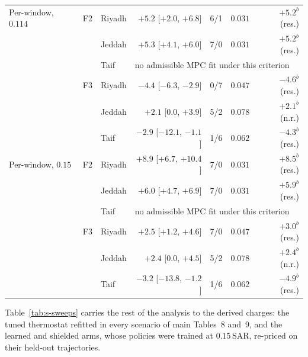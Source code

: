 \documentclass[11pt]{article}
\newcommand{\SAR}{\text{SAR}}
\begin{document}
\begin{table}[!ht]
\begin{tabularx}{\textwidth}{@{}llXrrrr@{}}
Per-window, $0.114$ & F2 & Riyadh & $+5.2$ [$+2.0$, $+6.8$] & 6/1 & $0.031$ & $+5.2^{b}$ (res.) \\
 &  & Jeddah & $+5.3$ [$+4.1$, $+6.0$] & 7/0 & $0.031$ & $+5.2^{b}$ (res.) \\
 &  & Taif & \multicolumn{4}{l}{no admissible MPC fit under this criterion} \\
 & F3 & Riyadh & $-4.4$ [$-6.3$, $-2.9$] & 0/7 & $0.047$ & $-4.6^{b}$ (res.) \\
 &  & Jeddah & $+2.1$ [$0.0$, $+3.9$] & 5/2 & $0.078$ & $+2.1^{b}$ (n.r.) \\
 &  & Taif & $-2.9$ [$-12.1$, $-1.1$] & 1/6 & $0.062$ & $-4.3^{b}$ (res.) \\
Per-window, $0.15$ & F2 & Riyadh & $+8.9$ [$+6.7$, $+10.4$] & 7/0 & $0.031$ & $+8.5^{b}$ (res.) \\
 &  & Jeddah & $+6.0$ [$+4.7$, $+6.9$] & 7/0 & $0.031$ & $+5.9^{b}$ (res.) \\
 &  & Taif & \multicolumn{4}{l}{no admissible MPC fit under this criterion} \\
 & F3 & Riyadh & $+2.5$ [$+1.2$, $+4.6$] & 7/0 & $0.047$ & $+3.0^{b}$ (res.) \\
 &  & Jeddah & $+2.4$ [$0.0$, $+4.5$] & 5/2 & $0.078$ & $+2.4^{b}$ (n.r.) \\
 &  & Taif & $-3.2$ [$-13.8$, $-1.2$] & 1/6 & $0.062$ & $-4.9^{b}$ (res.) \\
\bottomrule
\end{tabularx}
\end{table}

Table~\ref{tab:s-sweeps} carries the rest of the analysis to the derived charges: the tuned thermostat refitted in every scenario of main Tables~8 and~9, and the learned and shielded arms, whose policies were trained at $0.15\,\SAR$, re-priced on their held-out trajectories.
\end{document}
